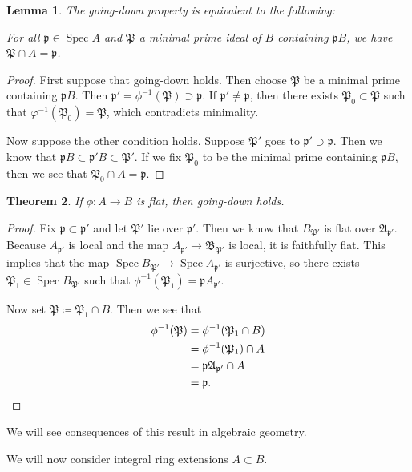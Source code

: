 \documentclass[leqno, openany]{memoir}
\newtheorem{thm}{Theorem}[section]
\newtheorem{lem}[thm]{Lemma}
\theoremstyle{definition}
\theoremstyle{remark}
\theoremstyle{plain}
\theoremstyle{definition}
\theoremstyle{remark}
\newcommand{\mf}[1]{\mathfrak{#1}}
\DeclareMathOperator{\Spec}{Spec}
\begin{document}
\begin{lem} \label{lem:goingdown} The going-down property is equivalent to the
    following:

    For all $\mf{p} \in \Spec A$ and $\mf{P}$ a minimal prime ideal of $B$
containing $\mf{p}B$, we have $\mf{P} \cap A = \mf{p}$.  \end{lem}

\begin{proof} First suppose that going-down holds. Then choose $\mf{P}$ be a
    minimal prime containing $\mf{p}B$. Then $\mf{p}' = \phi^{-1} (\mf{P})
    \supset \mf{p}$. If $\mf{p}' \neq \mf{p}$, then there exists $\mf{P}_0
    \subset \mf{P}$ such that $\varphi^{-1}(\mf{P}_0) = \mf{P}$, which
    contradicts minimality.

    Now suppose the other condition holds. Suppose $\mf{P}'$ goes to $\mf{p}'
\supset \mf{p}$. Then we know that $\mf{p} B \subset \mf{p}' B \subset
\mf{P}'$. If we fix $\mf{P}_0$ to be the minimal prime containing $\mf{p}B$,
then we see that $\mf{P}_0 \cap A = \mf{p}$.  \end{proof}

\begin{thm} If $\phi: A \to B$ is flat, then going-down holds.  \end{thm}

\begin{proof} Fix $\mf{p} \subset \mf{p}'$ and let $\mf{P}'$ lie over
    $\mf{p}'$. Then we know that $B_{\mf{P}'}$ is flat over $\mf{A}_{\mf{p}'}$.
    Because $A_{\mf{p}'}$ is local and the map $A_{\mf{p}'} \to
    \mf{B}_{\mf{P}'}$ is local, it is faithfully flat. This implies that the
    map $\Spec B_{\mf{P}'} \to \Spec A_{\mf{p}'}$ is surjective, so there
    exists $\mf{P}_1 \in \Spec B_{\mf{P}'}$ such that $\phi^{-1}(\mf{P}_1) =
    \mf{p} A_{\mf{p}'}$. 

    Now set $\mf{P} \coloneqq \mf{P}_1 \cap B$. Then we see that \begin{align*}
    \phi^{-1}(\mf{P}) &= \phi^{-1}(\mf{P}_1 \cap B) \\ &= \phi^{-1}(\mf{P}_1)
\cap A \\ &= \mf{p A_{\mf{p}'}} \cap A \\ &= \mf{p}. \qedhere \end{align*}
\end{proof}

We will see consequences of this result in algebraic geometry.

We will now consider integral ring extensions $A \subset B$.
\end{document}
